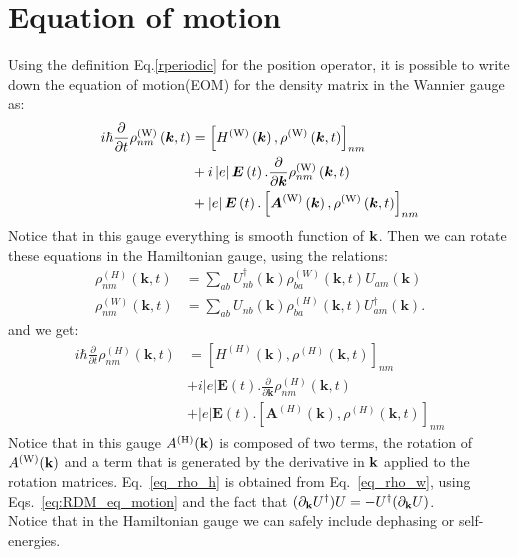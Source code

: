 \documentclass[preprint,showpacs,prb,superscriptaddress,aps,floatfix]{revtex4-1}
\newcommand{\kk}{{\bf k}}
\renewcommand{\[}{\left[}
\renewcommand{\]}{\right]}
\renewcommand{\(}{\left(}
\renewcommand{\)}{\right)}
\def\pw{^{({\rm W})}}
\def\ph{^{({\rm H})}}
\begin{document}
\section{Equation of motion}
Using the definition Eq.\ref{rperiodic} for the position operator, it is possible to write down the equation of motion(EOM) for the density matrix in the Wannier gauge as:
\begin{align}
i\hbar\frac{\partial}{\partial t}\rho\pw_{nm}\left(\boldsymbol{k},t\right) & =\left[H\pw\left(\boldsymbol{k}\right),\rho\pw\left(\boldsymbol{k},t\right)\right]_{nm}\nonumber \\
 & +i\left|e\right|\boldsymbol{E}\left(t\right).\frac{\partial}{\partial\boldsymbol{k}}\rho\pw_{nm}\left(\boldsymbol{k},t\right)\nonumber \\
 & +\left|e\right|\boldsymbol{E}\left(t\right).\left[\boldsymbol{A}\pw\left(\boldsymbol{k}\right),\rho\pw\left(\boldsymbol{k},t\right)\right]_{nm}\label{eq:RDM_eq_motion}
\end{align}
Notice that in this gauge everything is smooth function of $\kk$. Then we can rotate these equations in the Hamiltonian gauge, using the relations:
\begin{align}
\rho_{nm}^{\left(H\right)}\left(\boldsymbol{k},t\right) & =\sum_{ab}U_{nb}^{\dagger}\left(\boldsymbol{k}\right)\rho_{ba}^{\left(W\right)}\left(\boldsymbol{k},t\right)U_{am}\left(\boldsymbol{k}\right)\\
	\rho_{nm}^{\left(W\right)}\left(\boldsymbol{k},t\right) & =\sum_{ab}U_{nb}\left(\boldsymbol{k}\right)\rho_{ba}^{\left(H\right)}\left(\boldsymbol{k},t\right)U_{am}^{\dagger}\left(\boldsymbol{k}\right). \label{eq_rho_w}
\end{align}
and we get:
\begin{align}
i\hbar\frac{\partial}{\partial t}\rho_{nm}^{\left(H\right)}\left(\boldsymbol{k},t\right) & =\left[H^{\left(H\right)}\left(\boldsymbol{k}\right),\rho^{\left(H\right)}\left(\boldsymbol{k},t\right)\right]_{nm}\nonumber \\
 & +i\left|e\right|\boldsymbol{E}\left(t\right).\frac{\partial}{\partial\boldsymbol{k}}\rho_{nm}^{\left(H\right)}\left(\boldsymbol{k},t\right)\nonumber \\
	& +\left|e\right|\boldsymbol{E}\left(t\right).\left[\boldsymbol{A}^{\left(H\right)}\left(\boldsymbol{k}\right),\rho^{\left(H\right)}\left(\boldsymbol{k},t\right)\right]_{nm} \label{eq_rho_h}
\end{align}
Notice that in this gauge $A\ph(\kk)$ is composed of two terms, the rotation of $A\pw(\kk)$ and a term that is generated by the derivative in $\kk$ applied to the rotation matrices. Eq.~\ref{eq_rho_h} is obtained from Eq.~\ref{eq_rho_w}, using Eqs.~\ref{eq:RDM_eq_motion} and the fact that $(\partial_\kk  U^\dagger) U = - U^\dagger( \partial_\kk U) $.\\
Notice that in the Hamiltonian gauge we can safely include dephasing or self-energies.
\end{document}
